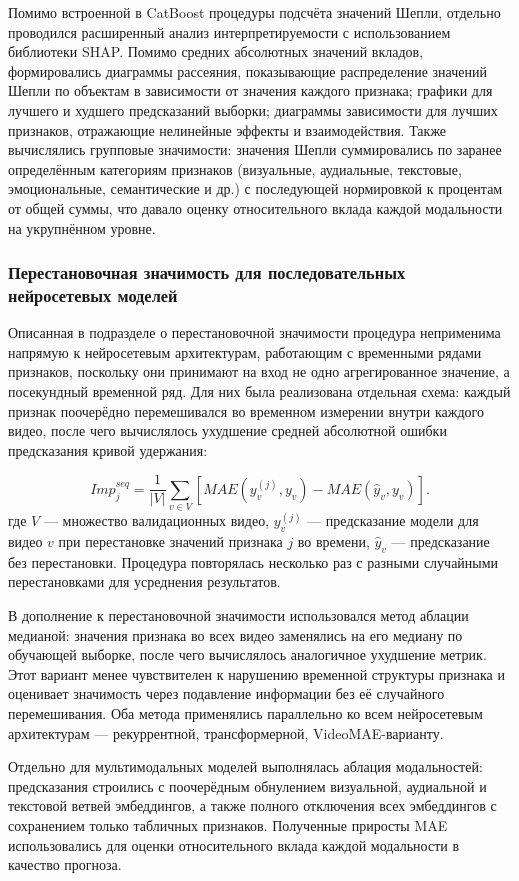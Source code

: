 \documentclass[times]{itmo-student-thesis}
\begin{document}
Помимо встроенной в CatBoost процедуры подсчёта значений Шепли, отдельно проводился расширенный анализ интерпретируемости с использованием библиотеки SHAP. Помимо средних абсолютных значений вкладов, формировались диаграммы рассеяния, показывающие распределение значений Шепли по объектам в зависимости от значения каждого признака; графики для лучшего и худшего предсказаний выборки; диаграммы зависимости для лучших признаков, отражающие нелинейные эффекты и взаимодействия. Также вычислялись групповые значимости: значения Шепли суммировались по заранее определённым категориям признаков (визуальные, аудиальные, текстовые, эмоциональные, семантические и др.) с последующей нормировкой к процентам от общей суммы, что давало оценку относительного вклада каждой модальности на укрупнённом уровне.

\subsubsection{Перестановочная значимость для последовательных нейросетевых моделей}

Описанная в подразделе о перестановочной значимости процедура неприменима напрямую к нейросетевым архитектурам, работающим с временными рядами признаков, поскольку они принимают на вход не одно агрегированное значение, а посекундный временной ряд. Для них была реализована отдельная схема: каждый признак поочерёдно перемешивался во временном измерении внутри каждого видео, после чего вычислялось ухудшение средней абсолютной ошибки предсказания кривой удержания:

\[
Imp_j^{seq}=\frac{1}{|V|}\sum_{v\in V}\left[MAE(y_v^{(j)},y_v)-MAE(\hat y_v,y_v)\right].
\]
где $V$ — множество валидационных видео, $y_v^{(j)}$ — предсказание модели для видео $v$ при перестановке значений признака $j$ во времени, $\hat y_v$ — предсказание без перестановки. Процедура повторялась несколько раз с разными случайными перестановками для усреднения результатов.

В дополнение к перестановочной значимости использовался метод аблации медианой: значения признака во всех видео заменялись на его медиану по обучающей выборке, после чего вычислялось аналогичное ухудшение метрик. Этот вариант менее чувствителен к нарушению временной структуры признака и оценивает значимость через подавление информации без её случайного перемешивания. Оба метода применялись параллельно ко всем нейросетевым архитектурам — рекуррентной, трансформерной, VideoMAE-варианту.

Отдельно для мультимодальных моделей выполнялась аблация модальностей: предсказания строились с поочерёдным обнулением визуальной, аудиальной и текстовой ветвей эмбеддингов, а также полного отключения всех эмбеддингов с сохранением только табличных признаков. Полученные приросты MAE использовались для оценки относительного вклада каждой модальности в качество прогноза.
\end{document}
